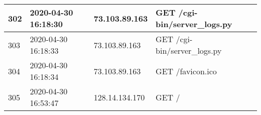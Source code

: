 \documentclass[12pt]{article}
\begin{document}
\begin{longtable}{|l|l|l|l|}
302 & 2020-04-30 16:18:30 & 73.103.89.163   & GET /cgi-bin/server\_logs.py                                                                                                        \\ \hline
303 & 2020-04-30 16:18:33 & 73.103.89.163   & GET /cgi-bin/server\_logs.py                                                                                                        \\ \hline
304 & 2020-04-30 16:18:34 & 73.103.89.163   & GET /favicon.ico                                                                                                                    \\ \hline
305 & 2020-04-30 16:53:47 & 128.14.134.170  & GET /                                                                                                                               \\ \hline
\end{longtable}
\end{document}
